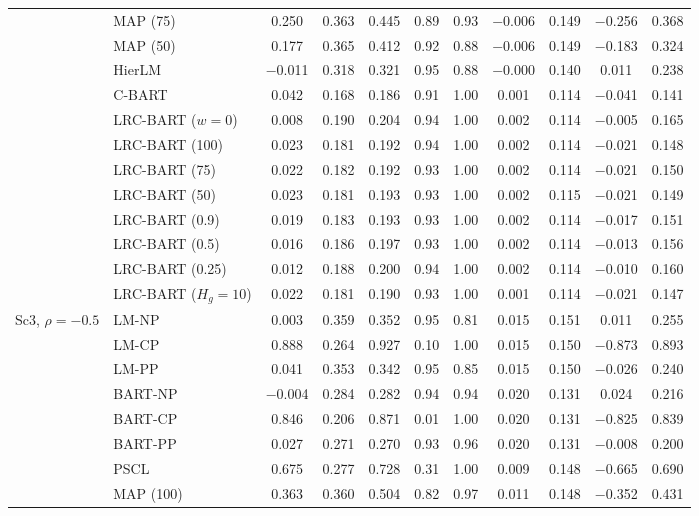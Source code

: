 \documentclass[11pt]{article}
\theoremstyle{definition}
\theoremstyle{plain}
\begin{document}
\begin{center}
\begin{longtable}{llccccccccc}
& MAP (75) & 0.250 & 0.363 & 0.445 & 0.89 & 0.93 & $-$0.006 & 0.149 & $-$0.256 & 0.368 \\
& MAP (50) & 0.177 & 0.365 & 0.412 & 0.92 & 0.88 & $-$0.006 & 0.149 & $-$0.183 & 0.324 \\
& HierLM & $-$0.011 & 0.318 & 0.321 & 0.95 & 0.88 & $-$0.000 & 0.140 & 0.011 & 0.238 \\
& C-BART & 0.042 & 0.168 & 0.186 & 0.91 & 1.00 & 0.001 & 0.114 & $-$0.041 & 0.141 \\
& LRC-BART ($w=0$) & 0.008 & 0.190 & 0.204 & 0.94 & 1.00 & 0.002 & 0.114 & $-$0.005 & 0.165 \\
& LRC-BART (100) & 0.023 & 0.181 & 0.192 & 0.94 & 1.00 & 0.002 & 0.114 & $-$0.021 & 0.148 \\
& LRC-BART (75) & 0.022 & 0.182 & 0.192 & 0.93 & 1.00 & 0.002 & 0.114 & $-$0.021 & 0.150 \\
& LRC-BART (50) & 0.023 & 0.181 & 0.193 & 0.93 & 1.00 & 0.002 & 0.115 & $-$0.021 & 0.149 \\
& LRC-BART (0.9) & 0.019 & 0.183 & 0.193 & 0.93 & 1.00 & 0.002 & 0.114 & $-$0.017 & 0.151 \\
& LRC-BART (0.5) & 0.016 & 0.186 & 0.197 & 0.93 & 1.00 & 0.002 & 0.114 & $-$0.013 & 0.156 \\
& LRC-BART (0.25) & 0.012 & 0.188 & 0.200 & 0.94 & 1.00 & 0.002 & 0.114 & $-$0.010 & 0.160 \\
& LRC-BART ($H_g=10$) & 0.022 & 0.181 & 0.190 & 0.93 & 1.00 & 0.001 & 0.114 & $-$0.021 & 0.147 \\
\midrule
\multirow{20}{*}{Sc3, $\rho=-0.5$} & LM-NP & 0.003 & 0.359 & 0.352 & 0.95 & 0.81 & 0.015 & 0.151 & 0.011 & 0.255 \\
& LM-CP & 0.888 & 0.264 & 0.927 & 0.10 & 1.00 & 0.015 & 0.150 & $-$0.873 & 0.893 \\
& LM-PP & 0.041 & 0.353 & 0.342 & 0.95 & 0.85 & 0.015 & 0.150 & $-$0.026 & 0.240 \\
& BART-NP & $-$0.004 & 0.284 & 0.282 & 0.94 & 0.94 & 0.020 & 0.131 & 0.024 & 0.216 \\
& BART-CP & 0.846 & 0.206 & 0.871 & 0.01 & 1.00 & 0.020 & 0.131 & $-$0.825 & 0.839 \\
& BART-PP & 0.027 & 0.271 & 0.270 & 0.93 & 0.96 & 0.020 & 0.131 & $-$0.008 & 0.200 \\
& PSCL & 0.675 & 0.277 & 0.728 & 0.31 & 1.00 & 0.009 & 0.148 & $-$0.665 & 0.690 \\
& MAP (100) & 0.363 & 0.360 & 0.504 & 0.82 & 0.97 & 0.011 & 0.148 & $-$0.352 & 0.431 \\

\end{longtable}
\end{center}
\end{document}
